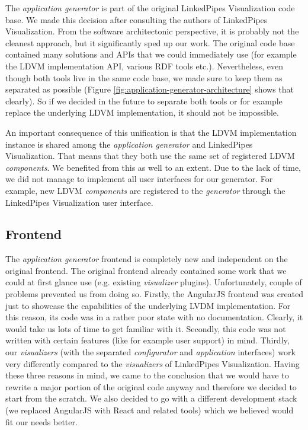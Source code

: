 The \emph{application generator} is part of the original LinkedPipes Visualization code base. We made this decision after consulting the authors of LinkedPipes Visualization. From the software architectonic perspective, it is probably not the cleanest approach, but it significantly sped up our work. The original code base contained many solutions and APIs that we could immediately use (for example the LDVM implementation API, various RDF tools etc.). Nevertheless, even though both tools live in the same code base, we made sure to keep them as separated as possible (Figure \ref{fig:application-generator-architecture} shows that clearly). So if we decided in the future to separate both tools or for example replace the underlying LDVM implementation, it should not be impossible.

An important consequence of this unification is that the LDVM implementation instance is shared among the \emph{application generator} and LinkedPipes Visualization. That means that they both use the same set of registered LDVM \emph{components}. We benefited from this as well to an extent. Due to the lack of time, we did not manage to implement all user interfaces for our generator. For example, new LDVM \emph{components} are registered to the \emph{generator} through the LinkedPipes Visualization user interface.

\subsection{Frontend}

The \emph{application generator} frontend is completely new and independent on the original frontend. The original frontend already contained some work that we could at first glance use (e.g. existing \emph{visualizer} plugins). Unfortunately, couple of problems prevented us from doing so. Firstly, the AngularJS frontend was created just to showcase the capabilities of the underlying LVDM implementation. For this reason, its code was in a rather poor state with no documentation. Clearly, it would take us lots of time to get familiar with it. Secondly, this code was not written with certain features (like for example user support) in mind. Thirdly, our \emph{visualizers} (with the separated \emph{configurator} and \emph{application} interfaces) work very differently compared to the \emph{visualizers} of LinkedPipes Visualization. Having these three reasons in mind, we came to the conclusion that we would have to rewrite a major portion of the original code anyway and therefore we decided to start from the scratch. We also decided to go with a different development stack (we replaced AngularJS with React and related tools) which we believed would fit our needs better. 

